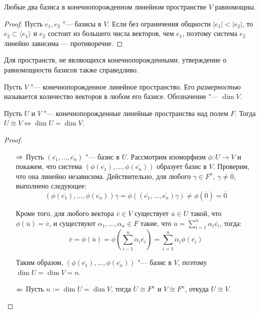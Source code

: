 \begin{corollary}
	Любые два базиса в конечнопорожденном линейном пространстве $V$ равномощны.
\end{corollary}

\begin{proof}
	Пусть $e_1, e_2$ "--- базисы в $V$. Если без ограничения общности $|e_1| < |e_2|$, то $e_2 \subset \langle e_1\rangle$ и $e_2$ состоит из большего числа векторов, чем $e_1$, поэтому система $e_2$ линейно зависима --- противоречие.
\end{proof}

\begin{note}
	Для пространств, не являющихся конечнопорожденными, утверждение о равномощности базисов также справедливо.
\end{note}

\begin{definition}
	Пусть $V$ "--- конечнопорожденное линейное пространство. Его \textit{размерностью} называется количество векторов в любом его базисе. Обозначение "--- $\dim{V}$.
\end{definition}

\begin{theorem}
	Пусть $U$ и $V$ "--- конечнопорожденные линейные пространства над полем $F$. Тогда $U \cong V \Leftrightarrow \dim{U} = \dim{V}$.
\end{theorem}

\begin{proof}~
	\begin{itemize}
		\item[$\Rightarrow$] Пусть $(\overline{e_1}, \dots, \overline{e_n})$ "--- базис в $U$. Рассмотрим изоморфизм $\phi : U \rightarrow V$ и покажем, что система $(\phi(\overline{e_1}), \dots, \phi(\overline{e_n}))$ образует базис в $V$. Проверим, что она линейно независима. Действительно, для любого $\gamma \in F^n$, $\gamma \ne \overline{0}$, выполнено следующее:
		\[(\phi(\overline{e_1}), \dots, \phi(\overline{e_n}))\gamma = \phi((\overline{e_1}, \dots, \overline{e_n})\gamma) \ne \phi(\overline{0}) = \overline{0}\]
		
		Кроме того, для любого вектора $\overline{v} \in V$ существует $\overline{u} \in U$ такой, что $\phi(\overline{u}) = \overline{v}$, и существуют $\alpha_1, \dotsc, \alpha_n \in F$ такие, что $\overline{u} = \sum_{i = 1}^{n}\alpha_i\overline{e_i}$, тогда:
		\[\overline{v} = \phi(\overline{u}) = \phi\left(\sum_{i - 1}^{n}\alpha_i\overline{e_i}\right) = \sum_{i = 1}^{n}\alpha_i\phi(\overline{e_i})\]
		
		Таким образом, $(\phi(\overline{e_1}), \dots, \phi(\overline{e_n}))$ "--- базис в $V$, поэтому $\dim{U} = \dim{V} = n$.
		
		\item[$\Leftarrow$] Пусть $n := \dim{U} = \dim{V}$, тогда $U \cong F^n$ и $V \cong F^n$, откуда $U \cong V$.\qedhere
	\end{itemize}
\end{proof}

